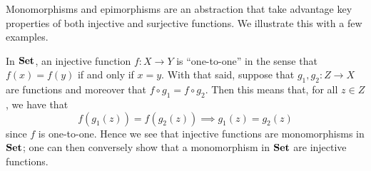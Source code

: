     \begin{minipage}{0.1\textwidth}
        \vspace{-2.2cm}

        \vspace{0.2cm}
        
    \end{minipage}
    \vspace{1cm}

    Monomorphisms and epimorphisms are an abstraction that take advantage key properties 
    of both injective and surjective functions. We illustrate this with a few examples. 

    \begin{example}
        In $\operatorname{\mathbf{Set}}$, an injective function $f: X \to Y$ is ``one-to-one'' in 
        the sense that $f(x) = f(y)$ if and only if $x = y$. With that said, suppose that 
        $g_1, g_2: Z \to X$ are functions and moreover that $f\circ g_1 = f \circ g_2$. 
        Then this means that, for all $z \in Z$, we have that 
        \[
            f(g_1(z)) = f(g_2(z)) \implies g_1(z) = g_2(z)    
        \]
        since $f$ is one-to-one. Hence we see that injective functions are 
        monomorphisms in $\operatorname{\mathbf{Set}}$; 
        one can then conversely show that a monomorphism in $\operatorname{\mathbf{Set}}$ 
        are injective functions. 
    \end{example}

